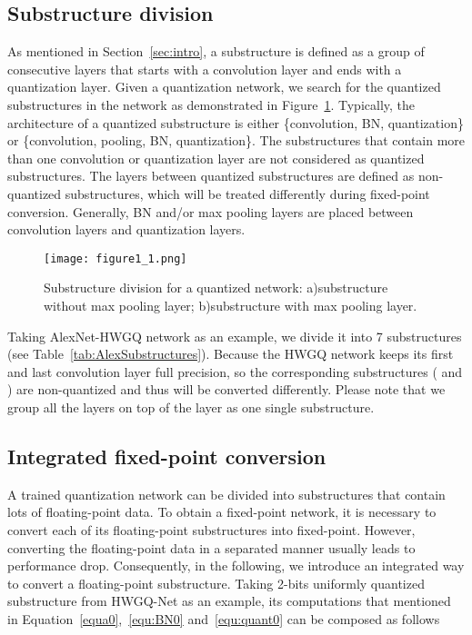 \documentclass[10pt,twocolumn,letterpaper]{article}
\begin{document}
\subsection{Substructure division}

As mentioned in Section~\ref{sec:intro}, a substructure is defined as a group of consecutive layers that starts with a convolution layer and ends with a quantization layer. Given a quantization network, we search for the quantized substructures in the network as demonstrated in Figure~\ref{fig:substructure}. Typically, the architecture of a quantized substructure is either \{convolution, BN, quantization\} or \{convolution, pooling, BN, quantization\}. The substructures that contain more than one convolution or quantization layer are not considered as quantized substructures. The layers between quantized substructures are defined as non-quantized substructures, which will be treated differently during fixed-point conversion. Generally, BN and/or max pooling layers are placed between convolution layers and quantization layers.  



\begin{figure}[t]
\begin{center}
\texttt{[image: figure1\_1.png]}
\end{center}
\caption{Substructure division for a quantized network: a)substructure without max pooling layer; b)substructure with max pooling layer.}
\label{fig:substructure}
\end{figure}

Taking AlexNet-HWGQ network as an example, we divide it into 7 substructures (see Table~\ref{tab:AlexSubstructures}). Because the HWGQ network keeps its first and last convolution layer full precision, so the corresponding substructures ( and ) are non-quantized and thus will be converted differently. Please note that we group all the layers on top of the  layer as one single substructure.



\subsection{Integrated fixed-point conversion} \label{intefixconv}

A trained quantization network can be divided into substructures that contain lots of floating-point data. To obtain a fixed-point network, it is necessary to convert each of its floating-point substructures into fixed-point. However, converting the floating-point data in a separated manner usually leads to performance drop. Consequently, in the following, we introduce an integrated way to convert a floating-point substructure. Taking 2-bits uniformly quantized substructure from HWGQ-Net as an example, its computations that mentioned in Equation~\ref{equa0},~\ref{equ:BN0} and~\ref{equ:quant0} can be composed as follows
\end{document}
